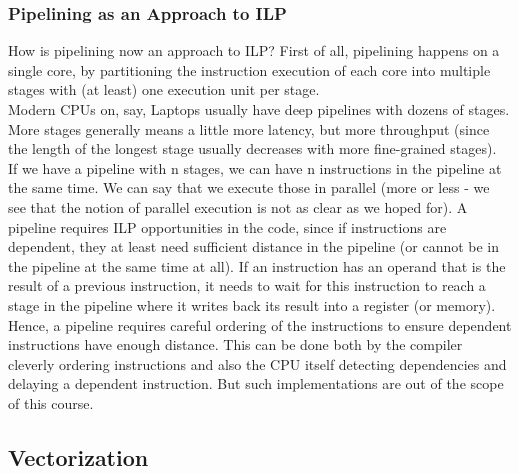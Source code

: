 \documentclass[main.tex]{subfiles}
\begin{document}
\subsubsection{Pipelining as an Approach to ILP}
How is pipelining now an approach to ILP? First of all, pipelining happens on a single core, by partitioning the instruction execution of each core into multiple stages with (at least) one execution unit per stage.\\[3mm]
Modern CPUs on, say, Laptops usually have deep pipelines with dozens of stages. More stages generally means a little more latency, but more throughput (since the length of the longest stage usually decreases with more fine-grained stages).\\[3mm]
If we have a pipeline with n stages, we can have n instructions in the pipeline at the same time. We can say that we execute those in parallel (more or less - we see that the notion of parallel execution is not as clear as we hoped for). A pipeline requires ILP opportunities in the code, since if instructions are dependent, they at least need sufficient distance in the pipeline (or cannot be in the pipeline at the same time at all). If an instruction has an operand that is the result of a previous instruction, it needs to wait for this instruction to reach a stage in the pipeline where it writes back its result into a register (or memory).\\[3mm]
Hence, a pipeline requires careful ordering of the instructions to ensure dependent instructions have enough distance. This can be done both by the compiler cleverly ordering instructions and also the CPU itself detecting dependencies and delaying a dependent instruction. But such implementations are out of the scope of this course.

\subsection{Vectorization}
\label{vectorization}
\end{document}

